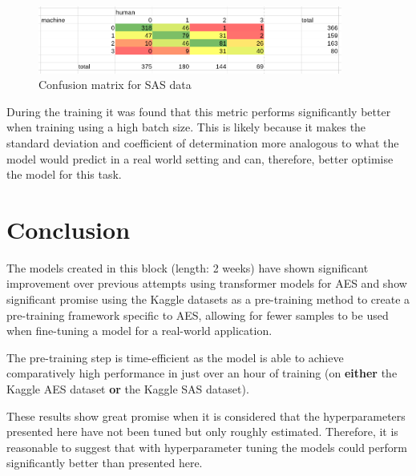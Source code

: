 \documentclass[11pt]{article}
\begin{document}
\begin{figure}[htbp]
\centering
\includegraphics[width=10cm]{./exp5_sas_confusion.png}
\caption{Confusion matrix for SAS data}
\end{figure}

During the training it was found that this metric performs significantly better when training using a high batch size. This is likely because it makes the standard deviation and coefficient of determination more analogous to what the model would predict in a real world setting and can, therefore, better optimise the model for this task.

\newpage

\section{Conclusion}
\label{sec:org89a18dc}
The models created in this block (length: 2 weeks) have shown significant improvement over previous attempts using transformer models for AES and show significant promise using the Kaggle datasets as a pre-training method to create a pre-training framework specific to AES, allowing for fewer samples to be used when fine-tuning a model for a real-world application.

The pre-training step is time-efficient as the model is able to achieve comparatively high performance in just over an hour of training (on \textbf{\textbf{either}} the Kaggle AES dataset \textbf{\textbf{or}} the Kaggle SAS dataset).

These results show great promise when it is considered that the hyperparameters presented here have not been tuned but only roughly estimated. Therefore, it is reasonable to suggest that with hyperparameter tuning the models could perform significantly better than presented here.



\end{document}
